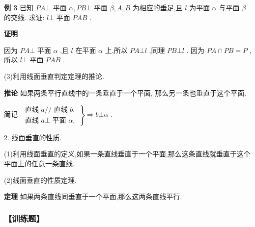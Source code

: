 \textbf{例 3} 已知 ${PA} \bot$ 平面 $\alpha ,{PB} \bot$ 平面 $\beta ,A,B$ 为相应的垂足,且 $l$ 为平面 $\alpha$ 与平面 $\beta$ 的交线. 求证: $l \bot$ 平面 ${PAB}$ .

\textbf{证明} 

因为 ${PA} \bot$ 平面 $\alpha$ ,且 $l$ 在平面 $\alpha$ 上,所以 ${PA} \bot  l$ ,同理 ${PB} \bot  l$ . 因为 ${PA} \cap  {PB} = P$ , 所以 $l \bot$ 平面 ${PAB}$ .

(3)利用线面垂直判定定理的推论.

\textbf{推论} 如果两条平行直线中的一条垂直于一个平面, 那么另一条也垂直于这个平面. 

简记 $\left. \begin{array}{l} \text{ 直线 }a//\text{ 直线 }b, \\  \text{ 直线 }a \bot  \text{ 平面 }\alpha , \end{array}\right\}   \Longrightarrow  b \bot  \alpha$ .

2. 线面垂直的性质.

(1)利用线面垂直的定义,如果一条直线垂直于一个平面,那么这条直线就垂直于这个平面上的任意一条直线.

(2)线面垂直的性质定理.

\textbf{定理} 如果两条直线同垂直于一个平面,那么这两条直线平行.

\subsubsection*{【训练题】}

